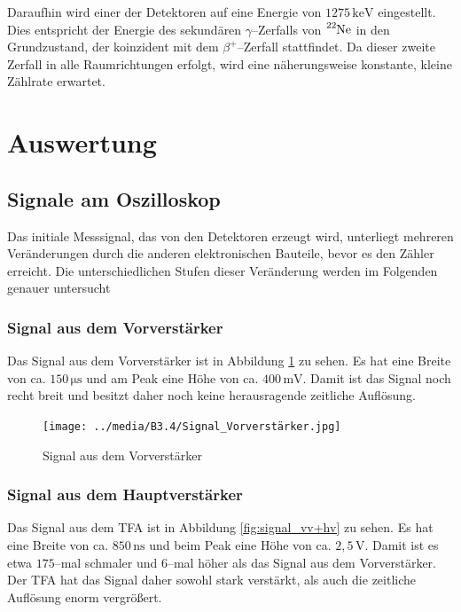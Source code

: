 \documentclass[12pt,a4paper]{scrartcl}
\numberwithin{equation}{section} %
\newcommand{\pu}[1]{\ensuremath{\mathrm{#1}}}
\begin{document}
Daraufhin wird einer der Detektoren auf eine Energie von $\pu{1275\,keV}$ eingestellt. Dies entspricht der Energie des sekundären $\gamma$--Zerfalls von $\ce{^{22}Ne}$ in den Grundzustand, der koinzident mit dem $\beta^+$--Zerfall stattfindet. Da dieser zweite Zerfall in alle Raumrichtungen erfolgt, wird eine näherungsweise konstante, kleine Zählrate erwartet.

\clearpage
\hypertarget{auswertung}{%
\section{Auswertung}\label{auswertung}}

\subsection{Signale am Oszilloskop}
Das initiale Messsignal, das von den Detektoren erzeugt wird, unterliegt mehreren Veränderungen durch die anderen elektronischen Bauteile, bevor es den Zähler erreicht. Die unterschiedlichen Stufen dieser Veränderung werden im Folgenden genauer untersucht

\subsubsection{Signal aus dem Vorverstärker}
Das Signal aus dem Vorverstärker ist in Abbildung \ref{fig:signal_vv} zu sehen. Es hat eine Breite von ca. $150 \mathrm{\, \mu s}$ und am Peak eine Höhe von ca. $400 \mathrm{\, mV}$. Damit ist das Signal noch recht breit und besitzt daher noch keine herausragende zeitliche Auflösung.

\begin{figure}[h]
	\centering
	\texttt{[image: ../media/B3.4/Signal\_Vorverstärker.jpg]}
	\caption{Signal aus dem Vorverstärker}
	\label{fig:signal_vv}
\end{figure}

\subsubsection{Signal aus dem Hauptverstärker}
Das Signal aus dem TFA ist in Abbildung \ref{fig:signal_vv+hv} zu sehen. Es hat eine Breite von ca. $850 \mathrm{\, ns}$ und beim Peak eine Höhe von ca. $2,5 \mathrm{\, V}$. Damit ist es etwa $175$--mal schmaler und $6$--mal höher als das Signal aus dem Vorverstärker. Der TFA hat das Signal daher sowohl stark verstärkt, als auch die zeitliche Auflösung enorm vergrößert.
\end{document}
